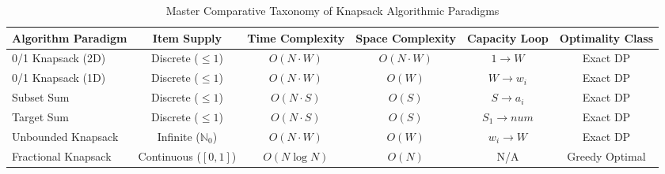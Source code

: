 \documentclass[10pt,journal,compsoc,onecolumn]{IEEEtran}
\begin{document}
\begin{table}[htbp]
\centering
\caption{Master Comparative Taxonomy of Knapsack Algorithmic Paradigms}
\label{tab:master-taxonomy}
\begin{tabular}{lccccc}
\toprule
\textbf{Algorithm Paradigm} & \textbf{Item Supply} & \textbf{Time Complexity} & \textbf{Space Complexity} & \textbf{Capacity Loop} & \textbf{Optimality Class} \\
\midrule
0/1 Knapsack (2D) & Discrete ($\le 1$) & $O(N \cdot W)$ & $O(N \cdot W)$ & $1 \to W$ & Exact DP \\
0/1 Knapsack (1D) & Discrete ($\le 1$) & $O(N \cdot W)$ & $O(W)$ & $W \to w_i$ & Exact DP \\
Subset Sum & Discrete ($\le 1$) & $O(N \cdot S)$ & $O(S)$ & $S \to a_i$ & Exact DP \\
Target Sum & Discrete ($\le 1$) & $O(N \cdot S)$ & $O(S)$ & $S_1 \to num$ & Exact DP \\
Unbounded Knapsack & Infinite ($\mathbb{N}_0$) & $O(N \cdot W)$ & $O(W)$ & $w_i \to W$ & Exact DP \\
Fractional Knapsack & Continuous ($[0,1]$) & $O(N \log N)$ & $O(N)$ & N/A & Greedy Optimal \\
\bottomrule
\end{tabular}
\end{table}
\end{document}
